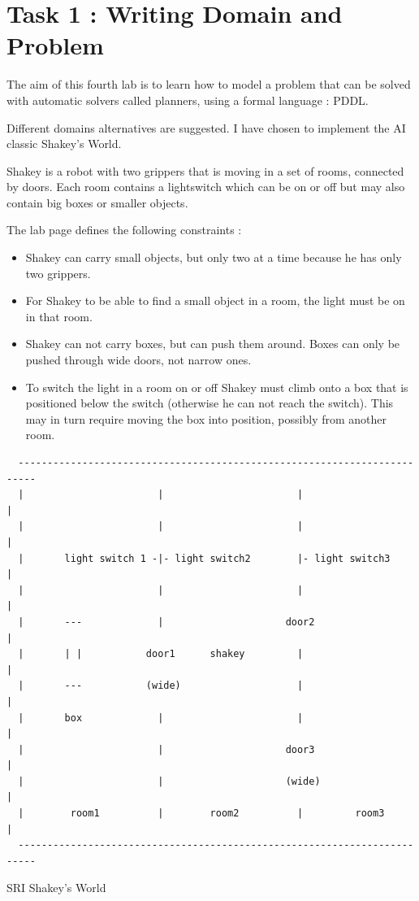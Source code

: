 \section*{Task 1 : Writing Domain and Problem}
\thispagestyle{empty}

The aim of this fourth lab is to learn how to model a problem that can be
solved with automatic solvers called planners, using a formal language : PDDL.

Different domains alternatives are suggested. I have chosen to implement the AI
classic Shakey's World.

Shakey is a robot with two grippers that is moving in a set of rooms, connected
by doors. Each room contains a lightswitch which can be on or off but may also
contain big boxes or smaller objects.

The lab page defines the following constraints :
\begin{itemize}
  \item Shakey can carry small objects, but only two at a time because he has
  only two grippers.
  \item For Shakey to be able to find a small object in a room, the light must
  be on in that room.
  \item Shakey can not carry boxes, but can push them around. Boxes can only be
  pushed through wide doors, not narrow ones.
  \item To switch the light in a room on or off Shakey must climb onto a box
  that is positioned below the switch (otherwise he can not reach the switch).
  This may in turn require moving the box into position, possibly from another
  room.
\end{itemize}

\begin{center}
  \begin{verbatim}
  -------------------------------------------------------------------------
  |                       |                       |                       |
  |                       |                       |                       |
  |       light switch 1 -|- light switch2        |- light switch3        |
  |                       |                       |                       |
  |       ---             |                     door2                     |
  |       | |           door1      shakey         |                       |
  |       ---           (wide)                    |                       |
  |       box             |                       |                       |
  |                       |                     door3                     |
  |                       |                     (wide)                    |
  |        room1          |        room2          |         room3         |
  -------------------------------------------------------------------------
  \end{verbatim}
  SRI Shakey's World
\end{center}

